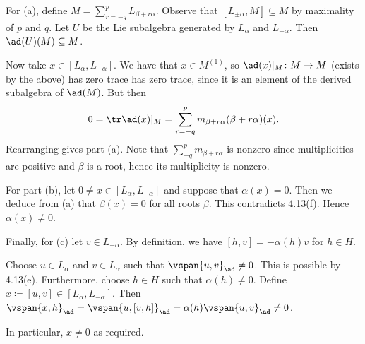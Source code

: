 For (a), define $M = \sum_{r=-q}^p L_{\beta + r\alpha}$. Observe that
$[L_{\pm\alpha}, M] \subseteq M$ by maximality of $p$ and $q$.
Let $U$ be the Lie subalgebra generated by $L_{\alpha}$ and $L_{-\alpha}$.
Then $\ad(U)(M) \subseteq M$.

Now take $x \in [L_\alpha, L_{-\alpha}]$. We have that $x \in M^{(1)}$, so
$\ad(x)|_M\colon M\to M$ (exists by the above) has zero trace has zero trace,
since it is an element of the derived subalgebra of $\ad(M)$. But then
\[ 0 = \tr \ad(x)|_M = \sum_{r=-q}^p m_{\beta + r\alpha}(\beta + r\alpha)(x). \]
Rearranging gives part (a). Note that $\sum_{-q}^p m_{\beta+r\alpha}$ is nonzero
since multiplicities are positive and $\beta$ is a root, hence its multiplicity
is nonzero.

For part (b), let $0\neq x \in [L_\alpha, L_{-\alpha}]$ and suppose that
$\alpha(x) = 0$. Then we deduce from (a) that $\beta(x) = 0$ for all
roots $\beta$. This contradicts 4.13(f). Hence $\alpha(x)\neq 0$.

Finally, for (c) let $v \in L_{-\alpha}$. By definition, we have
$[h, v] = -\alpha(h)v$ for $h \in H$.

Choose $u \in L_\alpha$ and $v \in L_{\alpha}$ such that $\vspan{u, v}_{\ad} \neq 0$.
This is possible by 4.13(e). Furthermore, choose $h \in H$ such that $\alpha(h)\neq 0$.
Define $x\coloneqq[u, v] \in [L_\alpha, L_{-\alpha}]$. Then
$\vspan{x, h}_{\ad} = \vspan{u, [v, h]}_{\ad} = \alpha(h)\vspan{u, v}_{\ad} \neq 0$.

In particular, $x\neq 0$ as required.
